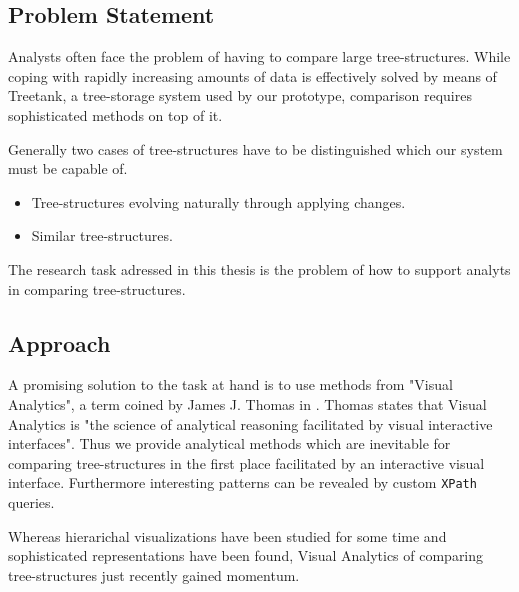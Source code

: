 \subsection{Problem Statement}\label{subsec::problem}
Analysts often face the problem of having to compare large tree-structures. While coping with rapidly increasing amounts of data is effectively solved by means of Treetank, a tree-storage system used by our prototype, comparison requires sophisticated methods on top of it. 

Generally two cases of tree-structures have to be distinguished which our system must be capable of.

\begin{itemize}
\item Tree-structures evolving naturally through applying changes.
\item Similar tree-structures.
\end{itemize}

The research task adressed in this thesis is the problem of how to support analyts in comparing tree-structures.

\subsection{Approach}
A promising solution to the task at hand is to use methods from "Visual Analytics", a term coined by James J. Thomas in \cite{VISUAL_ANALYTICS}. Thomas states that Visual Analytics is "the science of analytical reasoning facilitated by visual interactive interfaces". Thus we provide analytical methods which are inevitable for comparing tree-structures in the first place facilitated by an interactive visual interface. Furthermore interesting patterns can be revealed by custom \texttt{XPath} queries.

Whereas hierarichal visualizations have been studied for some time and sophisticated representations have been found, Visual Analytics of comparing tree-structures just recently gained momentum.

